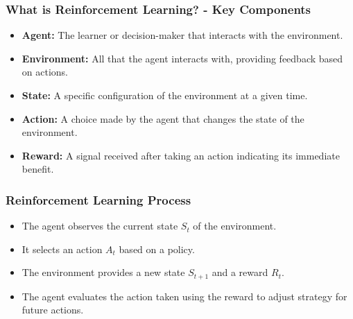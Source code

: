\documentclass[aspectratio=169]{beamer}
\begin{document}
\begin{frame}[fragile]
    \frametitle{What is Reinforcement Learning? - Key Components}
    \begin{itemize}
        \item \textbf{Agent:} The learner or decision-maker that interacts with the environment.
        \item \textbf{Environment:} All that the agent interacts with, providing feedback based on actions.
        \item \textbf{State:} A specific configuration of the environment at a given time.
        \item \textbf{Action:} A choice made by the agent that changes the state of the environment.
        \item \textbf{Reward:} A signal received after taking an action indicating its immediate benefit.
    \end{itemize}
\end{frame}

\begin{frame}[fragile]
    \frametitle{Reinforcement Learning Process}
    \begin{itemize}
        \item The agent observes the current state \(S_t\) of the environment.
        \item It selects an action \(A_t\) based on a policy.
        \item The environment provides a new state \(S_{t+1}\) and a reward \(R_t\).
        \item The agent evaluates the action taken using the reward to adjust strategy for future actions.
    \end{itemize}
    \begin{center}
    \end{center}
\end{frame}
\end{document}
